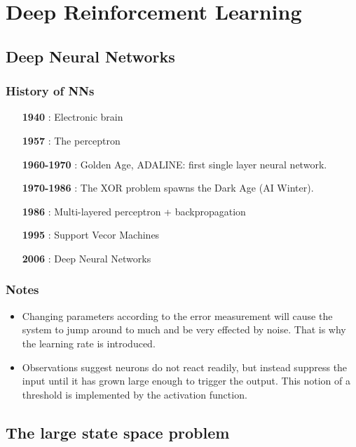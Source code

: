 \section{Deep Reinforcement Learning}
\label{sec:drl}


\subsection{Deep Neural Networks}

\subsubsection{History of NNs}

\begin{itemize}
    \item[\textbf{1940}]: Electronic brain
    \item[\textbf{1957}]: The perceptron 
    \item[\textbf{1960-1970}]: Golden Age, ADALINE: first single layer neural network. 
    \item[\textbf{1970-1986}]: The XOR problem spawns the Dark Age (AI Winter). 
    \item[\textbf{1986}]: Multi-layered perceptron + backpropagation 
    \item[\textbf{1995}]: Support Vecor Machines 
    \item[\textbf{2006}]: Deep Neural Networks
\end{itemize}

\subsubsection{Notes}

\begin{itemize}
    \item Changing parameters according to the error measurement will cause the system to jump around to much and be very effected by noise. That is why the learning rate is introduced.
    \item Observations suggest neurons do not react readily, but instead suppress the input until it has grown large enough to trigger the output. This notion of a threshold is implemented by the activation function.
\end{itemize}


\subsection{The large state space problem}

